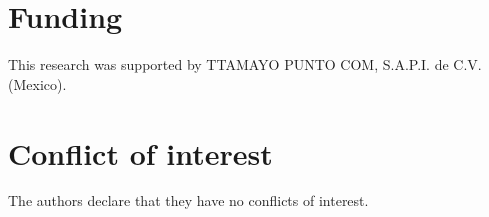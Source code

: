 \section*{Funding}
This research was supported by TTAMAYO PUNTO COM, S.A.P.I. de C.V. (Mexico).

\section*{Conflict of interest}
The authors declare that they have no conflicts of interest.

